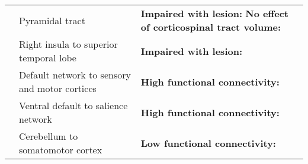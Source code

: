 \begin{table}[t!]
\begin{threeparttable}
\begin{tabular*}{\textwidth}{
    >{\raggedright}p{}
    >{\raggedright}p{}
    >{\raggedright\arraybackslash}p{}}
\cline{2-3}
& Pyramidal tract & 
    \textbf{Impaired with lesion:} \textcite{grunkina2017} 
    \newline 
    \textbf{No effect of corticospinal tract volume:} \textcite{sachs2016} \\
    
\cline{2-3}
& Right insula to superior temporal lobe & 
    \textbf{Impaired with lesion:} \textcite{satoh2016} \\
    
\cline{2-3}
& Default network to sensory and motor cortices & 
    \textbf{High functional connectivity:} \textcite{williams2018} \\
    
\cline{2-3}
& Ventral default to salience network & 
    \textbf{High functional connectivity:} \textcite{williams2018} \\
    
\cline{2-3}
& Cerebellum to somatomotor cortex & 
    \textbf{Low functional connectivity:} \textcite{williams2018} \\
    
\hline

\end{tabular*}
\end{threeparttable}
\end{table}